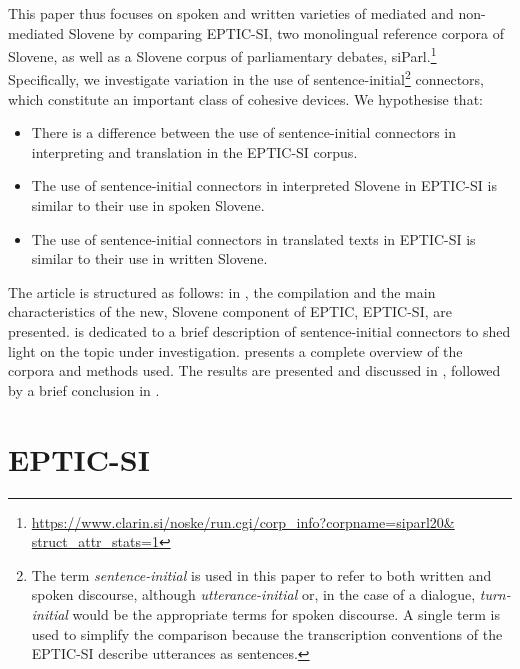 \documentclass[output=paper]{langscibook}
\begin{document}
This paper thus focuses on spoken and written varieties of mediated and non-mediated Slovene by comparing EPTIC-SI, two monolingual reference corpora of Slovene, as well as a Slovene corpus of parliamentary debates, siParl.\footnote{\url{https://www.clarin.si/noske/run.cgi/corp\_info?corpname=siparl20\& struct\_attr\_stats=1}} Specifically, we investigate variation in the use of sentence-initial\footnote{The term \textit{sentence-initial} is used in this paper to refer to both written and spoken discourse, although \textit{utterance-initial} or, in the case of a dialogue, \textit{turn-initial} would be the appropriate terms for spoken discourse. A single term is used to simplify the comparison because the transcription conventions of the EPTIC-SI describe utterances as sentences.} connectors, which constitute an important class of cohesive devices. We hypothesise that:

\begin{itemize}
\item
There is a difference between the use of sentence-initial connectors in interpreting and translation in the EPTIC-SI corpus.
\item
The use of sentence-initial connectors in interpreted Slovene in EPTIC-SI is similar to their use in spoken Slovene.
\item
The use of sentence-initial connectors in translated texts in EPTIC-SI is similar to their use in written Slovene.
\end{itemize}

The article is structured as follows: in , the compilation and the main characteristics of the new, Slovene component of EPTIC, EPTIC-SI, are presented.  is dedicated to a brief description of sentence-initial connectors to shed light on the topic under investigation.  presents a complete overview of the corpora and methods used. The results are presented and discussed in , followed by a brief conclusion in .

\section{
EPTIC-SI 
}\label{sec:mikolic:2}
\end{document}
